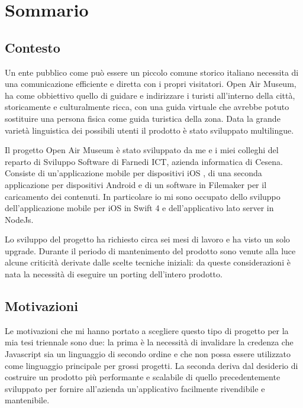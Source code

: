 \chapter*{Sommario} %
\label{sommario}

\vspace{5mm}

\section*{Contesto}\vspace{5mm}

Un ente pubblico come può essere un piccolo comune storico italiano necessita di una comunicazione efficiente e diretta con i propri visitatori. Open Air Museum, ha come obbiettivo quello di guidare e indirizzare i turisti all’interno della città, storicamente e culturalmente ricca, con una guida virtuale che avrebbe potuto sostituire una persona fisica come guida turistica della zona. Data la grande varietà linguistica dei possibili utenti il prodotto è stato sviluppato multilingue.\vspace{5mm}

Il progetto Open Air Museum è stato sviluppato da me e i miei colleghi del reparto di Sviluppo Software di Farnedi ICT\cite{FICT}, azienda informatica di Cesena. Consiste di un’applicazione mobile per dispositivi iOS\cite{IOS} , di una seconda applicazione per dispositivi Android\cite{ANDROID} e di un software in Filemaker\cite{FileMaker} per il caricamento dei contenuti. In particolare io mi sono occupato dello sviluppo dell’applicazione mobile per iOS\cite{IOS} in Swift 4\cite{Swift} e dell’applicativo lato server in NodeJs\cite{Nodejs}.\vspace{5mm}

Lo sviluppo del progetto ha richiesto circa sei mesi di lavoro e ha visto un solo upgrade. Durante il periodo di mantenimento del prodotto sono venute alla luce alcune criticità derivate dalle scelte tecniche iniziali: da queste considerazioni è nata la necessità di eseguire un porting dell'intero prodotto. 

\section*{Motivazioni}\vspace{5mm}

Le motivazioni che mi hanno portato a scegliere questo tipo di progetto per la mia tesi triennale sono due: la prima è la necessità di invalidare la credenza che Javascript\cite{JS} sia un linguaggio di secondo ordine e che non possa essere utilizzato come linguaggio principale per grossi progetti. La seconda deriva dal desiderio di costruire un prodotto più performante e scalabile di quello precedentemente sviluppato per fornire all'azienda un'applicativo facilmente rivendibile e mantenibile. 

